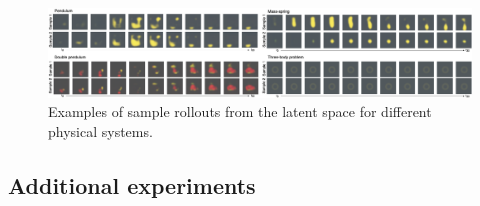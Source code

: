     
    


\begin{figure}
    \centering
    \includegraphics[width=\textwidth]{pictures/rollout_samples/new_sampling.png}
    \caption{Examples of sample rollouts from the latent space for different physical systems.}
    \label{fig:samples}
\end{figure}

\subsection{Additional experiments} \label{sec:additional_experiments}

